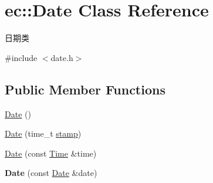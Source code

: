 \hypertarget{classec_1_1Date}{\section{ec\-:\-:Date Class Reference}
\label{classec_1_1Date}
}


日期类  




{\ttfamily \#include $<$date.\-h$>$}

\subsection*{Public Member Functions}
\begin{DoxyCompactItemize}
\item 
\hyperlink{classec_1_1Date_a87b10f3e182109a78d3b68e9b1ed20e2}{Date} ()
\item 
\hyperlink{classec_1_1Date_a8862acf628e847927edaea397113036b}{Date} (time\-\_\-t \hyperlink{classec_1_1Date_ae376652bff3f8476f948c14cb00601c5}{stamp})
\item 
\hyperlink{classec_1_1Date_aa73c77460f766467202a9695b7b7649c}{Date} (const \hyperlink{classec_1_1Time}{Time} \&time)
\item 
\hypertarget{classec_1_1Date_ae3e63bec9accf142fe9a238a43e93626}{{\bfseries Date} (const \hyperlink{classec_1_1Date}{Date} \&date)}\label{classec_1_1Date_ae3e63bec9accf142fe9a238a43e93626}


\end{DoxyCompactItemize}
